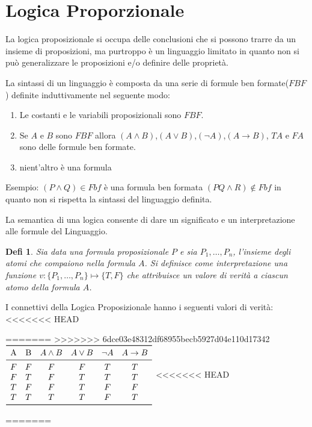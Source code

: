 \documentclass[a4paper]{book}
\newtheorem*{defi}{Defi}%
\begin{document}
\section{Logica Proporzionale}
La logica proposizionale si occupa delle conclusioni che si possono trarre da un insieme di proposizioni,
ma purtroppo è un linguaggio limitato in quanto non si può generalizzare le proposizioni e/o definire delle proprietà.

La sintassi di un linguaggio è composta da una serie di formule ben formate($FBF$) definite induttivamente nel seguente modo:
\begin{enumerate}
  \item Le costanti e le variabili proposizionali sono $FBF$.
  \item Se $A$ e $B$ sono $FBF$ allora $(A \land B)$,$(A \lor B)$,$(\neg A)$,$(A \rightarrow B)$,
        $TA$ e $FA$ sono delle formule ben formate.
  \item nient'altro è una formula
\end{enumerate}

Esempio:\newline
$(P \land Q) \in Fbf$  è una formula ben formata\newline
$(PQ \land R) \not \in Fbf$ in quanto non si rispetta la sintassi del linguaggio definita.\newline

La semantica di una logica consente di dare un significato e un interpretazione alle formule del Linguaggio.\newline
\begin{defi}
  Sia data una formula proposizionale $P$ e sia ${P_1,\dots,P_n}$, l'insieme degli atomi che compaiono nella formula $A$.\newline
  Si definisce come \emph{interpretazione} una funzione $v:\{P_1,\dots,P_n\} \mapsto \{T,F\}$ che attribuisce un valore di verità
  a ciascun atomo della formula $A$.
\end{defi}
I connettivi della Logica Proposizionale hanno i seguenti valori di verità:
<<<<<<< HEAD
\begin{table}
=======
>>>>>>> 6dce03e48312df68955becb5927d04e110d17342
$\begin{array}{cccccc}
\toprule
\text{A} & \text{B} & A \land B & A \lor B & \neg A & A \rightarrow B\\
\midrule
    F & F & F & F & T & T\\
    F & T & F & T & T & T\\
    T & F & F & T & F & F\\
    T & T & T & T & F & T\\
\bottomrule
\end{array}$
<<<<<<< HEAD
\end{table}
=======
\end{document}
